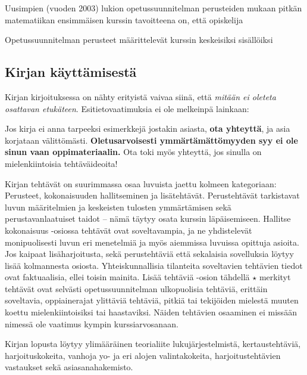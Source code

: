 Uusimpien (vuoden 2003) lukion opetussuunnitelman perusteiden mukaan pitkän matematiikan ensimmäisen kurssin tavoitteena on, että opiskelija

Opetussuunnitelman perusteet määrittelevät kurssin keskeisiksi sisällöiksi

\newpage

\subsection*{Kirjan käyttämisestä}

Kirjan kirjoituksessa on nähty erityistä vaivaa siinä, että \textit{mitään ei oleteta osattavan etukäteen}. Esitietovaatimuksia ei ole melkeinpä lainkaan:


Jos kirja ei anna tarpeeksi esimerkkejä jostakin asiasta, \textbf{ota yhteyttä}, ja asia korjataan välittömästi. \textbf{Oletusarvoisesti ymmärtämättömyyden syy ei ole sinun vaan oppimateriaalin.} Ota toki myös yhteyttä, jos sinulla on mielenkiintoisia tehtäväideoita!

Kirjan tehtävät on suurimmassa osaa luvuista jaettu kolmeen kategoriaan: Perusteet, kokonaisuuden hallitseminen ja lisätehtävät. Perustehtävät tarkistavat luvun määritelmien ja keskeisten tulosten ymmärtämisen sekä perustavanlaatuiset taidot -- nämä täytyy osata kurssin läpäisemiseen. Hallitse kokonaisuus -osiossa tehtävät ovat soveltavampia, ja ne yhdistelevät monipuolisesti luvun eri menetelmiä ja myös aiemmissa luvuissa opittuja asioita. Jos kaipaat lisäharjoitusta, sekä perustehtäviä että sekalaisia sovelluksia löytyy lisää kolmannesta osiosta. Yhteiskunnallisia tilanteita soveltavien tehtävien tiedot ovat faktuaalisia, ellei toisin mainita. Lisää tehtäviä -osion tähdellä $\star$ merkityt tehtävät ovat selvästi opetussuunnitelman ulkopuolisia tehtäviä, erittäin soveltavia, oppiainerajat ylittäviä tehtäviä, pitkiä tai tekijöiden mielestä muuten koettu mielenkiintoisiksi tai haastaviksi. Näiden tehtävien osaaminen ei missään nimessä ole vaatimus kympin kurssiarvosanaan.

Kirjan lopusta löytyy ylimääräinen teorialiite lukujärjestelmistä, kertaustehtäviä, harjoituskokeita, vanhoja yo- ja eri alojen valintakokeita, harjoitustehtävien vastaukset sekä asiasanahakemisto.